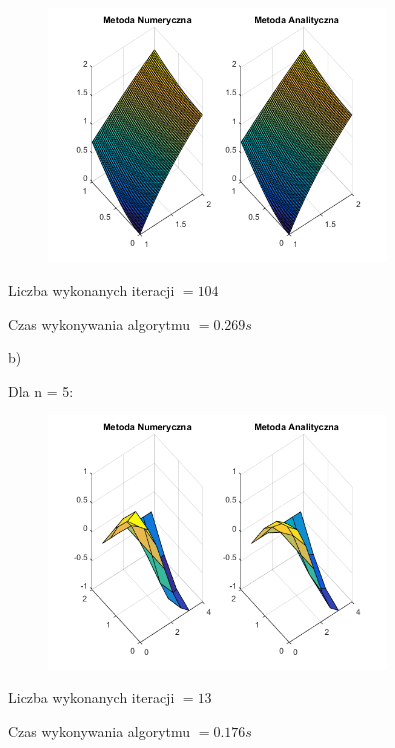 \begin{figure}[!ht]
	\begin{center}
		\includegraphics[width=0.8\textwidth]{Lab6/charts/young/zad1/50.png}
	\end{center}
\end{figure}

Liczba wykonanych iteracji $ = 104 $

Czas wykonywania algorytmu $ = 0.269 s$

b)

Dla n = 5:

\begin{figure}[!ht]
	\begin{center}
		\includegraphics[width=0.8\textwidth]{Lab6/charts/young/zad2/5.png}
	\end{center}
\end{figure}

Liczba wykonanych iteracji $ = 13 $

Czas wykonywania algorytmu $ = 0.176 s$

